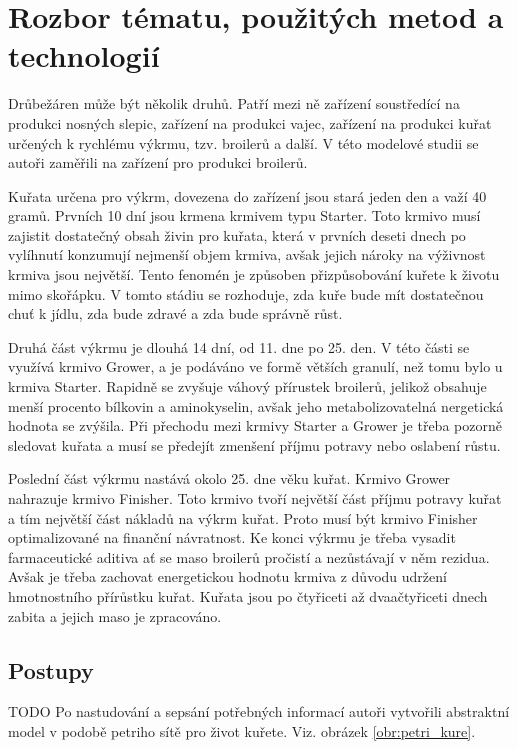 \documentclass[a4paper,10pt]{article}
\begin{document}
%
%

\section{Rozbor tématu, použitých metod a technologií}
Drůbežáren může být několik druhů. Patří mezi ně zařízení soustředící 
na produkci nosných slepic, zařízení na produkci vajec, zařízení 
na produkci kuřat určených k rychlému výkrmu, tzv. broilerů a další.
V této modelové studii se autoři zaměřili na zařízení pro produkci broilerů.
\par
Kuřata určena pro výkrm, dovezena do zařízení jsou stará jeden den 
a važí 40 gramů. Prvních 10 dní jsou krmena krmivem typu Starter. Toto krmivo 
musí zajistit dostatečný obsah živin pro kuřata, která v prvních deseti dnech
po vylíhnutí konzumují nejmenší objem krmiva, avšak jejich nároky na výživnost krmiva
jsou největší. Tento fenomén je způsoben přizpůsobování kuřete k životu mimo skořápku.
V tomto stádiu se rozhoduje, zda kuře bude mít dostatečnou chuť k jídlu, zda bude zdravé
a zda bude správně růst.
\par
Druhá část výkrmu je dlouhá 14 dní, od 11. dne po 25. den. V této části se využívá krmivo
Grower, a je podáváno ve formě větších granulí, než tomu bylo u krmiva Starter.
Rapidně se zvyšuje váhový přírustek broilerů, jelikož obsahuje menší procento bílkovin
a aminokyselin, avšak jeho metabolizovatelná nergetická hodnota se zvýšila. Při přechodu
mezi krmivy Starter a Grower je třeba pozorně sledovat kuřata a musí se předejít zmenšení
příjmu potravy nebo oslabení růstu.
\par
Poslední část výkrmu nastává okolo 25. dne věku kuřat. Krmivo Grower nahrazuje krmivo Finisher.
Toto krmivo tvoří největší část příjmu potravy kuřat a tím největší část nákladů na výkrm kuřat.
Proto musí být krmivo Finisher optimalizované na finanční návratnost. Ke konci výkrmu
je třeba vysadit farmaceutické aditiva ať se maso broilerů pročistí 
a nezůstávají v něm rezidua. Avšak je třeba zachovat energetickou hodnotu krmiva z důvodu
udržení hmotnostního přírůstku kuřat. Kuřata jsou po čtyřiceti až dvaačtyřiceti dnech zabita
a jejich maso je zpracováno.


\subsection{Postupy}
TODO\newline
Po nastudování a sepsání potřebných informací autoři vytvořili abstraktní model v podobě
petriho sítě\cite{petriho_sit} pro život kuřete. Viz. obrázek \ref{obr:petri_kure}.\newline
\end{document}

